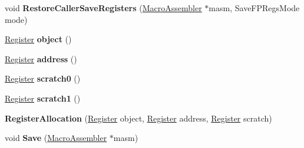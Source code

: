 \begin{DoxyCompactItemize}
\item 
void {\bfseries Restore\+Caller\+Save\+Registers} (\hyperlink{classv8_1_1internal_1_1_macro_assembler}{Macro\+Assembler} $\ast$masm, Save\+F\+P\+Regs\+Mode mode)\hypertarget{classv8_1_1internal_1_1_record_write_stub_1_1_register_allocation_ab0958eb63ba22b285852dcc0cc87c285}{}\label{classv8_1_1internal_1_1_record_write_stub_1_1_register_allocation_ab0958eb63ba22b285852dcc0cc87c285}

\item 
\hyperlink{structv8_1_1internal_1_1_register}{Register} {\bfseries object} ()\hypertarget{classv8_1_1internal_1_1_record_write_stub_1_1_register_allocation_ae02efad51bfcbf6207b6bd04c1331e06}{}\label{classv8_1_1internal_1_1_record_write_stub_1_1_register_allocation_ae02efad51bfcbf6207b6bd04c1331e06}

\item 
\hyperlink{structv8_1_1internal_1_1_register}{Register} {\bfseries address} ()\hypertarget{classv8_1_1internal_1_1_record_write_stub_1_1_register_allocation_a7b0d92fe5d7ba3d4339a055369bc1750}{}\label{classv8_1_1internal_1_1_record_write_stub_1_1_register_allocation_a7b0d92fe5d7ba3d4339a055369bc1750}

\item 
\hyperlink{structv8_1_1internal_1_1_register}{Register} {\bfseries scratch0} ()\hypertarget{classv8_1_1internal_1_1_record_write_stub_1_1_register_allocation_ae60e0fd70f8010f33818c9a5a30d0057}{}\label{classv8_1_1internal_1_1_record_write_stub_1_1_register_allocation_ae60e0fd70f8010f33818c9a5a30d0057}

\item 
\hyperlink{structv8_1_1internal_1_1_register}{Register} {\bfseries scratch1} ()\hypertarget{classv8_1_1internal_1_1_record_write_stub_1_1_register_allocation_a5834c8a35762e9a5346835d345b69bd2}{}\label{classv8_1_1internal_1_1_record_write_stub_1_1_register_allocation_a5834c8a35762e9a5346835d345b69bd2}

\item 
{\bfseries Register\+Allocation} (\hyperlink{structv8_1_1internal_1_1_register}{Register} object, \hyperlink{structv8_1_1internal_1_1_register}{Register} address, \hyperlink{structv8_1_1internal_1_1_register}{Register} scratch)\hypertarget{classv8_1_1internal_1_1_record_write_stub_1_1_register_allocation_a5f29af81416d69f911aa689984ee83bb}{}\label{classv8_1_1internal_1_1_record_write_stub_1_1_register_allocation_a5f29af81416d69f911aa689984ee83bb}

\item 
void {\bfseries Save} (\hyperlink{classv8_1_1internal_1_1_macro_assembler}{Macro\+Assembler} $\ast$masm)\hypertarget{classv8_1_1internal_1_1_record_write_stub_1_1_register_allocation_a76f90ec53d09edfeb4a3de14141c921d}{}\label{classv8_1_1internal_1_1_record_write_stub_1_1_register_allocation_a76f90ec53d09edfeb4a3de14141c921d}


\end{DoxyCompactItemize}
